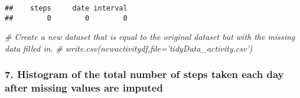 \documentclass[]{article}
\newenvironment{Shaded}{\begin{snugshade}}{\end{snugshade}}
\newcommand{\KeywordTok}[1]{\textcolor[rgb]{0.13,0.29,0.53}{\textbf{#1}}}
\newcommand{\DataTypeTok}[1]{\textcolor[rgb]{0.13,0.29,0.53}{#1}}
\newcommand{\DecValTok}[1]{\textcolor[rgb]{0.00,0.00,0.81}{#1}}
\newcommand{\StringTok}[1]{\textcolor[rgb]{0.31,0.60,0.02}{#1}}
\newcommand{\CommentTok}[1]{\textcolor[rgb]{0.56,0.35,0.01}{\textit{#1}}}
\newcommand{\ControlFlowTok}[1]{\textcolor[rgb]{0.13,0.29,0.53}{\textbf{#1}}}
\newcommand{\OperatorTok}[1]{\textcolor[rgb]{0.81,0.36,0.00}{\textbf{#1}}}
\newcommand{\NormalTok}[1]{#1}
\begin{document}
\begin{Shaded}
\end{Shaded}

\begin{verbatim}
##    steps     date interval 
##        0        0        0
\end{verbatim}

\begin{Shaded}
\begin{Highlighting}[]
\CommentTok{# Create a new dataset that is equal to the original dataset but with the missing data filled in.}
\CommentTok{# write.csv(newactivitydf,file='tidyData_activity.csv')}
\end{Highlighting}
\end{Shaded}

\subsubsection{7. Histogram of the total number of steps taken each day
after missing values are
imputed}\label{histogram-of-the-total-number-of-steps-taken-each-day-after-missing-values-are-imputed}

\begin{Shaded}
\end{Shaded}
\end{document}
